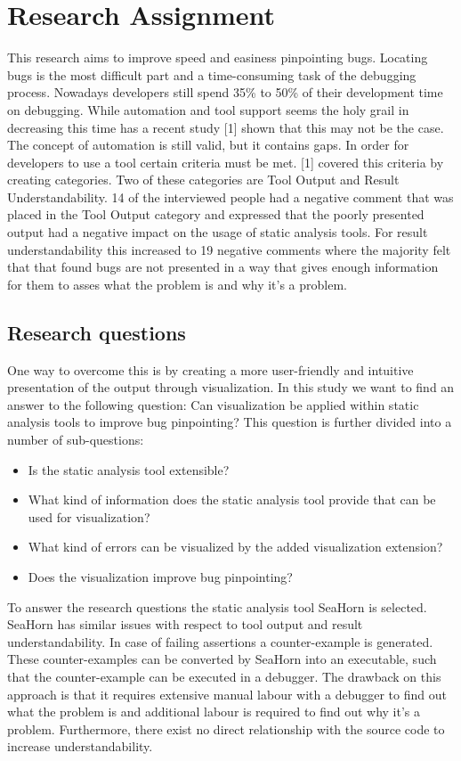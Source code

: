 \section{Research Assignment}
This research aims to improve speed and easiness pinpointing bugs. Locating bugs is the most difficult part and a time-consuming task of the debugging process. Nowadays developers still spend 35\% to 50\% of their development time on debugging. While automation and tool support seems the holy grail in decreasing this time has a recent study [1] shown that this may not be the case. The concept of automation is still valid, but it contains gaps. In order for developers to use a tool certain criteria must be met. [1] covered this criteria by creating categories. Two of these categories are Tool Output and Result Understandability. 14 of the interviewed people had a negative comment that was placed in the Tool Output category and expressed that the poorly presented output had a negative impact on the usage of static analysis tools. For result understandability this increased to 19 negative comments where the majority felt that that found bugs are not presented in a way that gives enough information for them to asses what the problem is and why it's a problem. 
\subsection{Research questions}
One way to overcome this is by creating a more user-friendly and intuitive presentation of the output through visualization. In this study we want to find an answer to the following question: 
\newline
\newline
Can visualization be applied within static analysis tools to improve bug pinpointing?
\newline
\newline
This question is further divided into a number of sub-questions:
\begin{itemize}
\item Is the static analysis tool extensible?
  \item What kind of information does the static analysis tool provide that can be used for visualization?
  \item What kind of errors can be visualized by the added visualization extension?
  \item Does the visualization improve bug pinpointing?
\end{itemize}
To answer the research questions the static analysis tool SeaHorn is selected. SeaHorn has similar issues with respect to tool output and result understandability. In case of failing assertions a counter-example is generated. These counter-examples can be converted by SeaHorn into an executable, such that the counter-example can be executed in a debugger. The drawback on this approach is that it requires extensive manual labour with a debugger to find out what the problem is and additional labour is required to find out why it’s a problem. Furthermore, there exist no direct relationship with the source code to increase understandability. 
